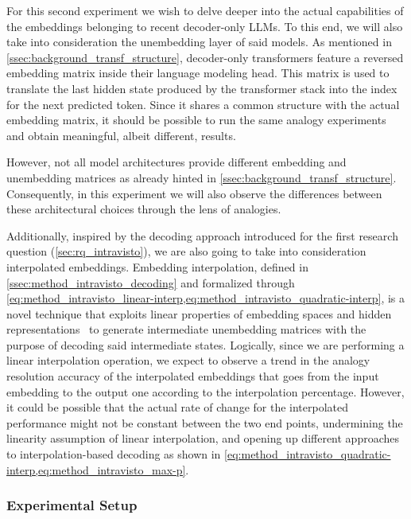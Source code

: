 For this second experiment we wish to delve deeper into the actual capabilities of the embeddings belonging to recent decoder-only LLMs.
To this end, we will also take into consideration the unembedding layer of said models.
As mentioned in \cref{ssec:background_transf_structure}, decoder-only transformers feature a reversed embedding matrix inside their language modeling head.
This matrix is used to translate the last hidden state produced by the transformer stack into the index for the next predicted token.
Since it shares a common structure with the actual embedding matrix, it should be possible to run the same analogy experiments and obtain meaningful, albeit different, results.

However, not all model architectures provide different embedding and unembedding matrices as already hinted in \cref{ssec:background_transf_structure}.
Consequently, in this experiment we will also observe the differences between these architectural choices through the lens of analogies.

Additionally, inspired by the decoding approach introduced for the first research question (\cref{sec:rq_intravisto}), we are also going to take into consideration interpolated embeddings.
Embedding interpolation, defined in \cref{ssec:method_intravisto_decoding} and formalized through \cref{eq:method_intravisto_linear-interp,eq:method_intravisto_quadratic-interp}, is a novel technique that exploits linear properties of embedding spaces and hidden representations~\cite{park2023, mikolov2013, drozd2016} to generate intermediate unembedding matrices with the purpose of decoding said intermediate states.
Logically, since we are performing a linear interpolation operation, we expect to observe a trend in the analogy resolution accuracy of the interpolated embeddings that goes from the input embedding to the output one according to the interpolation percentage.
However, it could be possible that the actual rate of change for the interpolated performance might not be constant between the two end points, undermining the linearity assumption of linear interpolation, and opening up different approaches to interpolation-based decoding as shown in \cref{eq:method_intravisto_quadratic-interp,eq:method_intravisto_max-p}.

\subsubsection{Experimental Setup}\label{sssec:exp_emb_exp2_expset}

